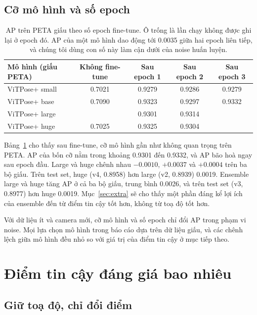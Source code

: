 \documentclass[11pt,a4paper]{article}
\begin{document}
\subsection{Cỡ mô hình và số epoch}

\begin{table}[H]
\centering\small
\begin{tabular}{@{}lcccc@{}}
\toprule
Mô hình (giấu PETA) & Không fine-tune & Sau epoch 1 & Sau epoch 2 & Sau epoch 3 \\
\midrule
ViTPose+ small & 0.7021 & 0.9279 & 0.9286 & 0.9279 \\
ViTPose+ base & 0.7090 & 0.9323 & 0.9297 & 0.9332 \\
ViTPose+ large & & 0.9301 & 0.9314 & \\
ViTPose+ huge & 0.7025 & 0.9325 & 0.9304 & \\
\bottomrule
\end{tabular}
\caption{AP trên PETA giấu theo số epoch fine-tune. Ô trống là lần chạy không được ghi lại ở epoch đó. AP của một mô hình dao động tới 0.0035 giữa hai epoch liên tiếp, và chúng tôi dùng con số này làm cận dưới của noise huấn luyện.}
\label{tab:epochs}
\end{table}

Bảng~\ref{tab:epochs} cho thấy sau fine-tune, cỡ mô hình gần như không quan trọng trên PETA. AP của bốn cỡ nằm trong khoảng 0.9301 đến 0.9332, và AP bão hoà ngay sau epoch đầu. Large và huge chênh nhau $-0.0010$, $+0.0037$ và $+0.0004$ trên ba bộ giấu. Trên test set, huge (v4, 0.8958) hơn large (v2, 0.8939) 0.0019. Ensemble large và huge tăng AP ở cả ba bộ giấu, trung bình 0.0026, và trên test set (v3, 0.8977) hơn huge 0.0019. Mục~\ref{sec:extra} sẽ cho thấy một phần đáng kể lợi ích của ensemble đến từ điểm tin cậy tốt hơn, không từ toạ độ tốt hơn.

\begin{ghichu}
Với dữ liệu ít và camera mới, cỡ mô hình và số epoch chỉ đổi AP trong phạm vi noise. Mọi lựa chọn mô hình trong báo cáo dựa trên dữ liệu giấu, và các chênh lệch giữa mô hình đều nhỏ so với giá trị của điểm tin cậy ở mục tiếp theo.
\end{ghichu}

\section{Điểm tin cậy đáng giá bao nhiêu}
\label{sec:score}

\subsection{Giữ toạ độ, chỉ đổi điểm}
\end{document}
